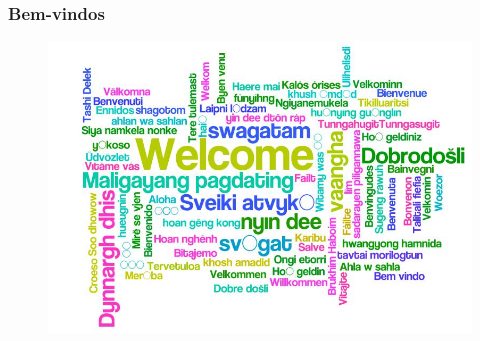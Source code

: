 \documentclass[aspectratio=169]{beamer}
\begin{document}

\begin{frame}\frametitle{Bem-vindos}
	\begin{figure}[h]
		\centering
		\includegraphics[height=0.7\paperheight]{pucrs-ec-poo-unidade_00-apresentacao_da_disciplina_e_revisao-laminas-welcome.jpg}
	\end{figure}
\end{frame}
\end{document}
